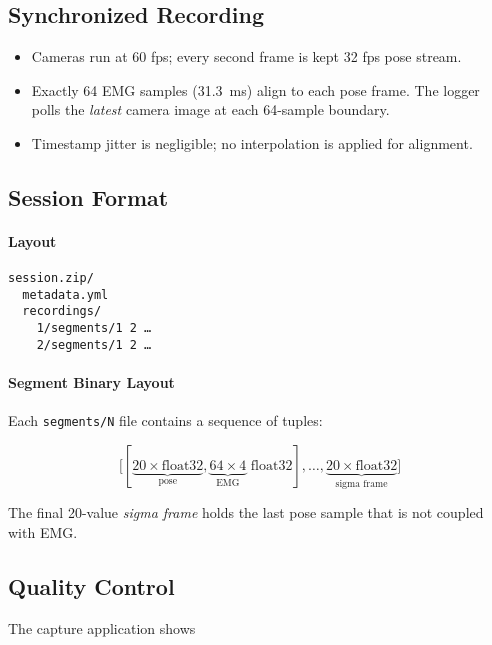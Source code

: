 \subsection{Synchronized Recording}

\begin{itemize}
  \item Cameras run at 60 fps; every second frame is kept 32 fps pose stream.
  \item Exactly 64 EMG samples (\SI{31.3}{ms}) align to each pose frame. The
        logger polls the \emph{latest} camera image at each 64-sample boundary.
  \item Timestamp jitter is negligible; no interpolation is
        applied for alignment.
\end{itemize}

\subsection{Session Format}

\paragraph{Layout}

\begin{verbatim}
session.zip/
  metadata.yml
  recordings/
    1/segments/1 2 …
    2/segments/1 2 …
\end{verbatim}

\paragraph{Segment Binary Layout}

Each \texttt{segments/N} file contains a sequence of tuples:

\[
\bigl[
  [\underbrace{20\! \times\! \text{float32}}_{\text{pose}},
   \underbrace{64\!\times\!4}_{\text{EMG}}\text{ float32}],
  \dots,
  \underbrace{20\! \times\! \text{float32}}_{\text{sigma frame}}
\bigr]
\]

The final 20-value \emph{sigma frame} holds the last pose sample that is not coupled with EMG.

\subsection{Quality Control}

The capture application shows


